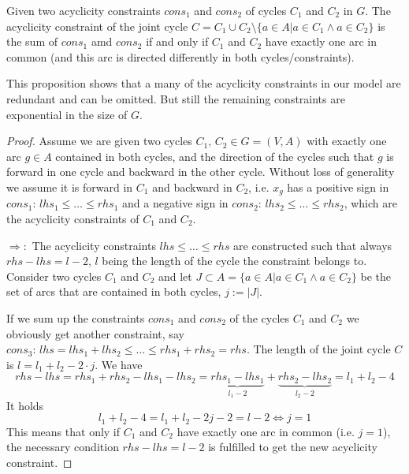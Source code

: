 \begin{prop}
 Given two acyclicity constraints $cons_1$ and $cons_2$ of cycles $C_1$ and $C_2$ in $G$. The acyclicity constraint of 
the joint cycle $C=C_1\cup C_2 \setminus \{a\in A| a\in C_1\land a\in C_2 \}$ is the sum of $cons_1$ amd $cons_2$ if 
and only if $C_1$ and $C_2$ have exactly one arc in common (and this arc is directed differently in both 
cycles/constraints).%
\end{prop}
This proposition shows that a many of the acyclicity constraints in our model are redundant and can be omitted. But 
still the remaining constraints are exponential in the size of $G$.

\begin{proof}
 Assume we are given two cycles $C_1,\,C_2\in G=(V,A)$ with exactly one arc $g\in A$ 
contained in both cycles, and the direction of the cycles such that $g$ is forward in one cycle and backward in the 
other cycle. Without loss of generality we assume it is forward in $C_1$ and backward in $C_2$, i.e. $x_g$ has a 
positive sign in $cons_1:\,lhs_1\le \dots\le rhs_1$ and a negative sign in $cons_2:\, lhs_2\le \dots\le rhs_2$, which 
are the acyclicity constraints of $C_1$ and $C_2$. 

$\Rightarrow :$ 
The acyclicity constraints $lhs \le \dots\le rhs$ are constructed such that always $rhs-lhs=l-2$, $l$ being the length 
of the cycle the constraint belongs to. Consider two cycles $C_1$ and $C_2$ and let $J\subset A=\{a\in A|a\in C_1 
\land a\in C_2 \}$ be the set of arcs that are contained in both cycles, $j:=|J|$. 

If we sum up the constraints $cons_1$ and $cons_2$ of the cycles $C_1$ and $C_2$ we obviously get another constraint,
say $cons_3:\, lhs=lhs_1+lhs_2\le\dots\le rhs_1+rhs_2=rhs$. The length of the joint cycle $C$ is $l=l_1+l_2-2\cdot j$. 
We have 
$$rhs-lhs=rhs_1+rhs_2-lhs_1-lhs_2=\underbrace{rhs_1-lhs_1}_{l_1-2}+\underbrace{rhs_2-lhs_2}_{l_2-2}=l_1+l_2-4$$
It holds
$$l_1+l_2-4=l_1+l_2-2j-2=l-2 \iff j=1$$ 
This means that only if $C_1$ and $C_2$ have exactly one arc in common (i.e. $j=1$), the necessary condition 
$rhs-lhs=l-2$ is fulfilled to get the new acyclicity constraint.


\end{proof}
